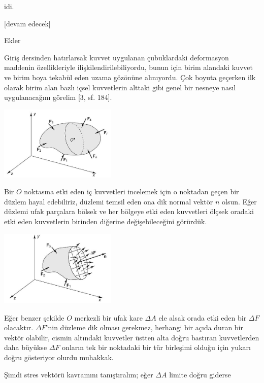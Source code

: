\documentclass[12pt,fleqn]{article}\usepackage{../../common}
\begin{document}
idi. 















[devam edecek]

Ekler

Giriş dersinden hatırlarsak kuvvet uygulanan çubuklardaki deformasyon maddenin
özellikleriyle ilişkilendirilebiliyordu, bunun için birim alandaki kuvvet ve
birim boya tekabül eden uzama gözönüne alınıyordu. Çok boyuta geçerken ilk
olarak birim alan bazlı içsel kuvvetlerin alttaki gibi genel bir nesneye
nasıl uygulanacağını görelim [3, sf. 184].

\includegraphics[width=15em]{phy_020_strs_02_app_01.jpg}

Bir $O$ noktasına etki eden iç kuvvetleri incelemek için o noktadan geçen bir
düzlem hayal edebiliriz, düzlemi temsil eden ona dik normal vektör $n$ olsun.
Eğer düzlemi ufak parçalara bölsek ve her bölgeye etki eden kuvvetleri ölçsek
oradaki etki eden kuvvetlerin birinden diğerine değişebileceğini görürdük.

\includegraphics[width=15em]{phy_020_strs_02_app_02.jpg}

Eğer benzer şekilde $O$ merkezli bir ufak kare $\Delta A$ ele alsak orada etki
eden bir $\Delta F$ olacaktır. $\Delta F$'nin düzleme dik olması gerekmez,
herhangi bir açıda duran bir vektör olabilir, cismin altındaki kuvvetler üstten
alta doğru bastıran kuvvetlerden daha büyükse $\Delta F$ onların tek bir
noktadaki bir tür birleşimi olduğu için yukarı doğru gösteriyor olurdu muhakkak.

Şimdi stres vektörü kavramını tanıştıralım; eğer $\Delta A$ limite doğru giderse
\end{document}
